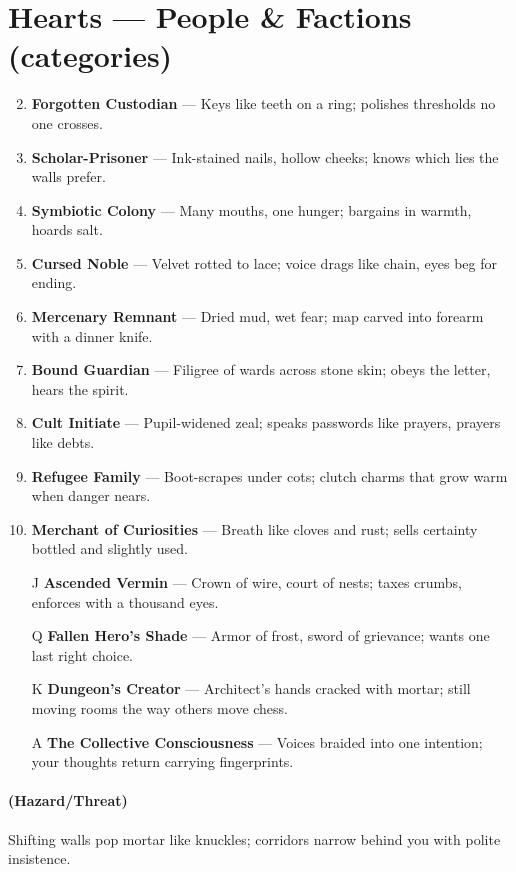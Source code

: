 \section*{Hearts --- People \& Factions (categories)}
\label{sec:dungeon-people}
\begin{enumerate}
\setcounter{enumi}{1}
\item \textbf{Forgotten Custodian} --- Keys like teeth on a ring; polishes thresholds no one crosses.
\item \textbf{Scholar-Prisoner} --- Ink-stained nails, hollow cheeks; knows which lies the walls prefer.
\item \textbf{Symbiotic Colony} --- Many mouths, one hunger; bargains in warmth, hoards salt.
\item \textbf{Cursed Noble} --- Velvet rotted to lace; voice drags like chain, eyes beg for ending.
\item \textbf{Mercenary Remnant} --- Dried mud, wet fear; map carved into forearm with a dinner knife.
\item \textbf{Bound Guardian} --- Filigree of wards across stone skin; obeys the letter, hears the spirit.
\item \textbf{Cult Initiate} --- Pupil-widened zeal; speaks passwords like prayers, prayers like debts.
\item \textbf{Refugee Family} --- Boot-scrapes under cots; clutch charms that grow warm when danger nears.
\item \textbf{Merchant of Curiosities} --- Breath like cloves and rust; sells certainty bottled and slightly used.
\item[J] \textbf{Ascended Vermin} --- Crown of wire, court of nests; taxes crumbs, enforces with a thousand eyes.
\item[Q] \textbf{Fallen Hero's Shade} --- Armor of frost, sword of grievance; wants one last right choice.
\item[K] \textbf{Dungeon's Creator} --- Architect's hands cracked with mortar; still moving rooms the way others move chess.
\item[A] \textbf{The Collective Consciousness} --- Voices braided into one intention; your thoughts return carrying fingerprints.
\end{enumerate}

\paragraph*{(Hazard/Threat)} Shifting walls pop mortar like knuckles; corridors narrow behind you with polite insistence.

